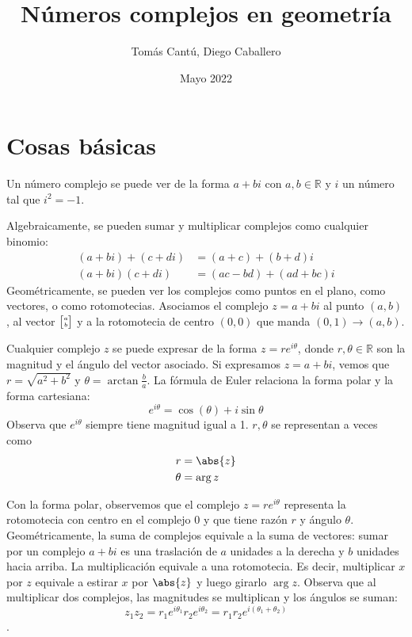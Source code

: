 \documentclass[11pt]{scrartcl}
\begin{document}
\title{Números complejos en geometría}
\date{Mayo 2022}
\author{Tomás Cantú, Diego Caballero}
\maketitle






\section{Cosas básicas}
Un número complejo se puede ver de la forma $a+bi$ con $a, b \in \mathbb R$ y $i$ un número tal que $i^2=-1$.

Algebraicamente, se pueden sumar y multiplicar complejos como cualquier binomio:
\begin{align*}
    (a+bi)+(c+di) &= (a+c)+(b+d)i \\
    (a+bi)(c+di) &=(ac-bd)+(ad+bc)i 
\end{align*}
Geométricamente, se pueden ver los complejos como puntos en el plano, como vectores, o como rotomotecias. Asociamos el complejo $z=a+bi$ al punto $(a, b)$, al vector $\tiny{\begin{bmatrix} a \\b  \end{bmatrix}}$ y a la rotomotecia de centro $(0, 0)$ que manda $(0, 1) \rightarrow (a, b)$. 

Cualquier complejo $z$ se puede expresar de la forma $z=re^{i\theta}$, donde $r, \theta \in \mathbb{R}$ son la magnitud y el ángulo del vector asociado. Si expresamos $z=a+bi$, vemos que $r=\sqrt{a^2+b^2}$ y $\theta=\arctan{\frac ba}$. La fórmula de Euler relaciona la forma polar y la forma cartesiana: 
$$e^{i\theta}=\cos(\theta)+i\sin\theta$$ Observa que $e^{i\theta}$ siempre tiene magnitud igual a 1.
$r, \theta$ se representan a veces como
\begin{align*}
    r &=\abs{z}\\
   \theta &=\arg{z}
\end{align*}

Con la forma polar, observemos que el complejo $z=re^{i\theta}$ representa la rotomotecia con centro en el complejo $0$ y que tiene razón $r$ y ángulo $\theta$. 
Geométricamente, la suma de complejos equivale a la suma de vectores: sumar por un complejo $a+bi$ es una traslación de $a$ unidades a la derecha y $b$ unidades hacia arriba. La multiplicación equivale a una rotomotecia. Es decir, multiplicar $x$ por $z$ equivale a estirar $x$ por $\abs{z}$ y luego girarlo $\arg{z}$. Observa que al multiplicar dos complejos, las magnitudes se multiplican y los ángulos se suman: $$z_1z_2=r_1e^{i\theta_1}r_2e^{i\theta_2}=r_1r_2e^{i(\theta_1+\theta_2)}$$. 
\end{document}
